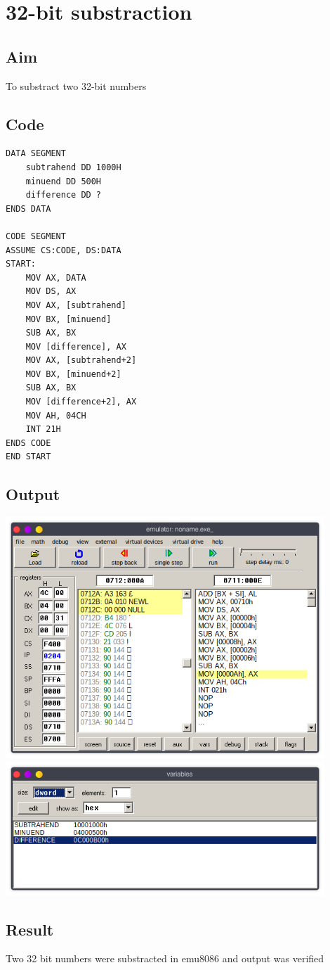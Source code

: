 \section{32-bit substraction}
\subsection{Aim}
To substract two 32-bit numbers

\subsection{Code}
\begin{lstlisting}
DATA SEGMENT
	subtrahend DD 1000H
	minuend DD 500H
	difference DD ?
ENDS DATA

CODE SEGMENT
ASSUME CS:CODE, DS:DATA
START:
	MOV AX, DATA
	MOV DS, AX
	MOV AX, [subtrahend]
	MOV BX, [minuend]
	SUB AX, BX
	MOV [difference], AX
	MOV AX, [subtrahend+2]
	MOV BX, [minuend+2]
	SUB AX, BX
	MOV [difference+2], AX
	MOV AH, 04CH
    INT 21H
ENDS CODE
END START
\end{lstlisting}

\subsection{Output}
\begin{center}
	\includegraphics[width=0.90\textwidth]{img/p4/ss1.png}
	\includegraphics[width=0.90\textwidth]{img/p4/ss2.png}
\end{center}

\subsection{Result}
Two 32 bit numbers were substracted in emu8086 and output was verified